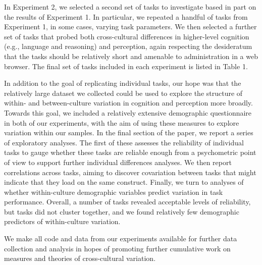 \documentclass[
  man,floatsintext]{apa6}
\begin{document}
In Experiment 2, we selected a second set of tasks to investigate based in part on the results of Experiment 1. In particular, we repeated a handful of tasks from Experiment 1, in some cases, varying task parameters. We then selected a further set of tasks that probed both cross-cultural differences in higher-level cognition (e.g., language and reasoning) and perception, again respecting the desideratum that the tasks should be relatively short and amenable to administration in a web browser. The final set of tasks included in each experiment is listed in Table 1.

In addition to the goal of replicating individual tasks, our hope was that the relatively large dataset we collected could be used to explore the structure of within- and between-culture variation in cognition and perception more broadly. Towards this goal, we included a relatively extensive demographic questionnaire in both of our experiments, with the aim of using these measures to explore variation within our samples. In the final section of the paper, we report a series of exploratory analyses. The first of these assesses the reliability of individual tasks to gauge whether these tasks are reliable enough from a psychometric point of view to support further individual differences analyses. We then report correlations across tasks, aiming to discover covariation between tasks that might indicate that they load on the same construct. Finally, we turn to analyses of whether within-culture demographic variables predict variation in task performance. Overall, a number of tasks revealed acceptable levels of reliability, but tasks did not cluster together, and we found relatively few demographic predictors of within-culture variation.

We make all code and data from our experiments available for further data collection and analysis in hopes of promoting further cumulative work on measures and theories of cross-cultural variation.
\end{document}
